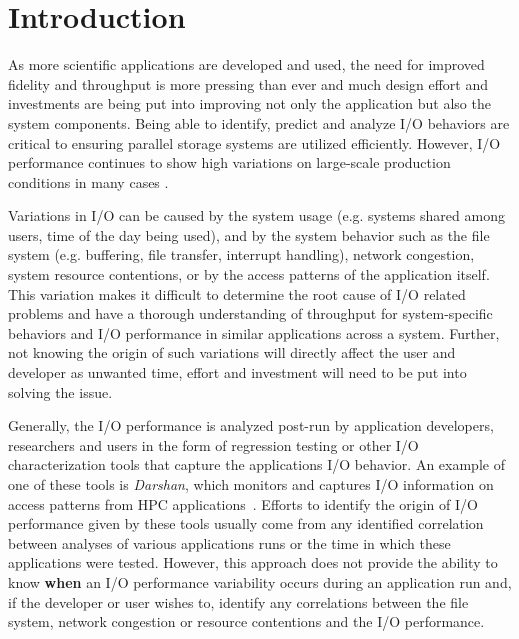 \section{Introduction}
As more scientific applications are developed and used, the need for
improved fidelity and throughput is more pressing than ever and much
design effort and investments are being put into improving not only
the application but also the system components. Being able to
identify, predict and analyze I/O behaviors are critical to ensuring
parallel storage systems are utilized efficiently. However, I/O
performance continues to show high variations on large-scale
production conditions in many cases . %

Variations in I/O can be caused by the system usage (e.g. systems
shared among users, time of the day being used), and by the system
behavior such as the file system (e.g. buffering, file transfer,
interrupt handling), network congestion, system resource contentions,
or by the access patterns of the application itself. This variation
makes it difficult to determine the root cause of I/O related problems
and have a thorough understanding of throughput for system-specific
behaviors and I/O performance in similar applications across a
system. Further, not knowing the origin of such variations will
directly affect the user and developer as unwanted time, effort and
investment will need to be put into solving the issue.

Generally, the I/O performance is analyzed post-run by application
developers, researchers and users in the form of regression testing or
other I/O characterization tools that capture the applications I/O
behavior. An example of one of these tools is \emph{Darshan}, which
monitors and captures I/O information on access patterns from HPC
applications~\cite{Darshan}.
Efforts to identify the origin of I/O performance given by these tools
usually come from any identified correlation between analyses of
various applications runs or the time in which these applications were
tested. However, this approach does not provide the ability to know
\textbf{when} an I/O performance variability occurs during an
application run and, if the developer or user wishes to, identify any
correlations between the file system, network congestion or resource
contentions and the I/O performance.

